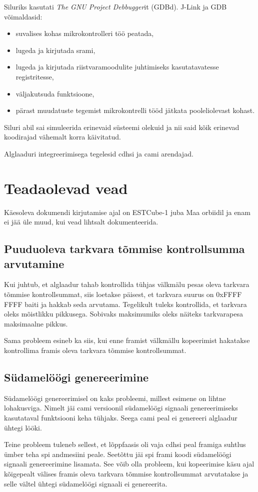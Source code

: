 \documentclass[12pt,a4paper]{article}
\begin{document}
Siluriks kasutati \textit{The GNU Project Debbugger}it (GDBd). J-Link ja GDB
võimaldasid:
\begin{itemize}
	\item suvalises kohas mikrokontrolleri töö peatada,
	\item lugeda ja kirjutada \gls{sram}i,
	\item lugeda ja kirjutada riistvaramoodulite juhtimiseks kasutatavatesse
		registritesse,
	\item väljakutsuda funktsioone,
	\item pärast muudatuste tegemist mikrokontrelli tööd jätkata pooleliolevast
		kohast.
\end{itemize}
Siluri abil sai simuleerida erinevaid süsteemi olekuid ja nii said kõik erinevad
koodirajad vähemalt korra käivitatud.

Alglaaduri integreerimisega tegelesid \gls{cdhs}i ja \gls{cam}i arendajad.

\section{Teadaolevad vead}
Käesoleva dokumendi kirjutamise ajal on ESTCube-1 juba Maa orbiidil ja enam ei
jää üle muud, kui vead lihtsalt dokumenteerida.  \subsection{Puuduoleva tarkvara
tõmmise kontrollsumma arvutamine} Kui juhtub, et alglaadur tahab kontrollida
tühjas välkmälu pesas oleva tarkvara tõmmise kontrollsummat, siis loetakse
päisest, et tarkvara suurus on 0xFFFF FFFF baiti ja hakkab seda arvutama.
Tegelikult tuleks kontrollida, et tarkvara oleks mõistlikku pikkusega. Sobivaks
maksimumiks oleks näiteks tarkvarapesa maksimaalne pikkus.

Sama probleem esineb ka siis, kui enne \gls{fram}ist välkmällu kopeerimist hakatakse
kontrollima \gls{fram}is oleva tarkvara tõmmise kontrollsummat.

\subsection{Südamelöögi genereerimine}
Südamelöögi genereerimisel on kaks probleemi, millest esimene on lihtne
lohakusviga. Nimelt jäi \gls{cam}i versioonil südamelöögi signaali
genereerimiseks kasutataval funktsiooni keha tühjaks. Seega \gls{cam}i peal ei
genereeri alglaadur ühtegi lööki.

Teine probleem tuleneb sellest, et lõppfaasis oli vaja \gls{cdhs}i peal
\gls{fram}iga suhtlus ümber teha \gls{spi} andmesiini peale. Seetõttu jäi
\gls{spi} \gls{fram}i koodi südamelöögi signaali genereerimine lisamata. See
võib olla probleem, kui kopeerimise käsu ajal kõigepealt välises
\gls{fram}is oleva tarkvara tõmmise kontrollsummat arvutatakse ja selle vältel
ühtegi südamelöögi signaali ei genereerita.
\end{document}
